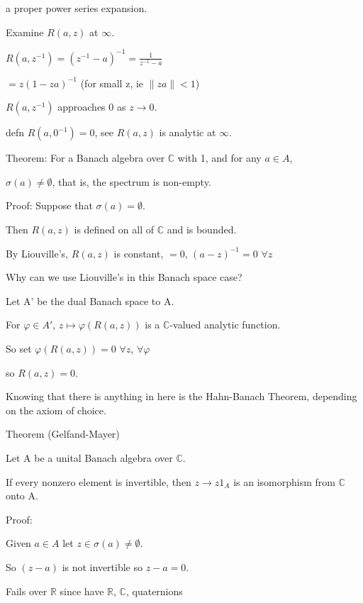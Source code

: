 \documentclass[12pt]{article}
\begin{document}
a proper power series expansion.

\noindent
Examine $R(a, z)$ at $\infty$.

$R(a, z^{-1}) = (z^{-1} - a)^{-1} = \frac{1}{z^{-1} - a}$ 

$ =z(1 - za)^{-1}$ (for small z, ie $\|za\| < 1$)

$R(a, z^{-1})$ approaches 0 as $z \to 0$.

defn $R(a, 0^{-1}) = 0$, see $R(a, z)$ is analytic at $\infty$.

\noindent
Theorem: For a Banach algebra over $\mathds{C}$ with 1, and for any $a \in A$,

$\sigma(a) \neq \emptyset$, that is, the spectrum is non-empty.

\noindent
Proof: Suppose that $\sigma(a) = \emptyset$.

Then $R(a, z)$ is defined on all of $\mathds{C}$ and is bounded.

By Liouville's, $R(a, z)$ is constant, $= 0$, $(a - z)^{-1} = 0$ $ \forall z$

Why can we use Liouville's in this Banach space case?

Let A' be the dual Banach space to A.

For $\varphi \in A'$, $z \mapsto \varphi(R(a, z))$ is a $\mathds{C}$-valued analytic function.

So set $\varphi(R(a, z)) = 0$ $\forall z$, $\forall \varphi$

so $R(a, z) = 0$.

Knowing that there is anything in here is the Hahn-Banach Theorem, depending on the axiom of choice.

\noindent
Theorem (Gelfand-Mayer)

Let A be a unital Banach algebra over $\mathds{C}$.

If every nonzero element is invertible, then $z \to z1_A$ is an isomorphism from $\mathds{C}$ onto A.

\noindent
Proof:

Given $a \in A$ let $z \in \sigma (a) \neq \emptyset$.

So $(z - a)$ is not invertible so $z - a = 0$.

Fails over $\mathds{R}$ since have $\mathds{R}$, $\mathds{C}$, quaternions
\end{document}
